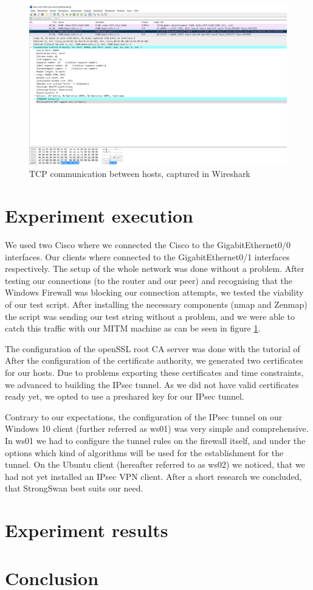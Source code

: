 \documentclass[a4paper]{report}
\begin{document}
\begin{figure}[htb]
	\includegraphics[width=\linewidth]{Testscript_unencrypted.png}
	\caption{TCP communication between hosts, captured in Wireshark}
	\label{fig:TestUnencrypted}
\end{figure}


\section{Experiment execution}
\label{sec:ExpExec}
We used two Cisco %
where we connected the Cisco %
to the GigabitEthernet0/0 interfaces. Our clients where connected to the GigabitEthernet0/1 interfaces respectively. The setup of the whole network was done without a problem. After testing our connections (to the router and our peer) and recognising that the Windows Firewall was blocking our connection attempts, we tested the viability of our test script. After installing the necessary components (nmap and Zenmap) the script was sending our test string without a problem, and we were able to catch this traffic with our MITM machine as can be seen in figure \ref{fig:TestUnencrypted}. 

The configuration of the openSSL root CA server was done with the tutorial of %
After the configuration of the certificate authority, we generated two certificates for our hosts. Due to problems exporting these certificates and time constraints, we advanced to building the IPsec tunnel. As we did not have valid certificates ready yet, we opted to use a preshared key for our IPsec tunnel.

Contrary to our expectations, the configuration of the IPsec tunnel on our Windows 10 client (further referred as ws01) was very simple and comprehensive. In ws01 we had to configure the tunnel rules on the firewall itself, and under the options which kind of algorithms will be used for the establishment for the tunnel.
On the Ubuntu client (hereafter referred to as ws02) we noticed, that we had not yet installed an IPsec VPN client. After a short research we concluded, that StrongSwan best suits our need.

\section{Experiment results}
\label{sec:ExpRes}

\section{Conclusion}
\label{sec:Conc}

\newpage

\printbibliography
\end{document}
